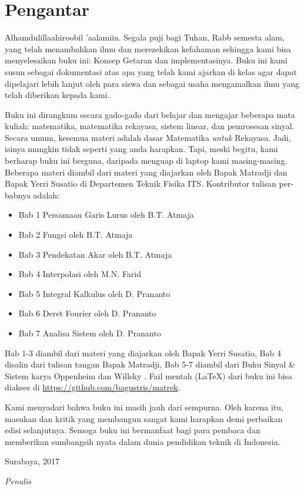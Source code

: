 \chapter*{Pengantar}

Alhamdulillaahiroobil 'aalamiin. Segala puji bagi Tuhan, Rabb semesta alam, yang telah menambahkan ilmu dan merezekikan kefahaman sehingga kami bisa menyelesaikan buku ini: Konsep Getaran dan implementasinya. Buku ini kami susun sebagai dokumentasi atas apa yang telah kami ajarkan di kelas agar dapat dipelajari lebih lanjut oleh para siswa dan sebagai usaha mengamalkan ilmu yang telah diberikan kepada kami.

Buku ini dirangkum secara gado-gado dari belajar dan mengajar beberapa mata kuliah: matematika, matematika rekayasa, sistem linear, dan pemrosesan sinyal. Secara umum, kesemua materi adalah dasar Matematika \textit{untuk} Rekayasa. Jadi, isinya mungkin tidak seperti yang anda harapkan. Tapi, meski begitu, kami berharap buku ini berguna, daripada menguap di laptop kami masing-masing. Beberapa materi diambil dari materi yang diajarkan oleh Bapak Matradji dan Bapak Yerri Susatio di Departemen Teknik Fisika ITS. Kontributor tulisan per-babnya adalah:  
\begin{itemize}
    \item Bab 1 Persamaan Garis Lurus oleh B.T. Atmaja 
    \item Bab 2 Fungsi oleh B.T. Atmaja 
    \item Bab 3 Pendekatan Akar oleh B.T. Atmaja 
    \item Bab 4 Interpolasi oleh M.N. Farid  
    \item Bab 5 Integral Kalkulus oleh D. Prananto 
    \item Bab 6 Deret Fourier oleh D. Prananto
    \item Bab 7 Analisa Sistem oleh D. Prananto  
\end{itemize}
Bab 1-3 diambil dari materi yang diajarkan oleh Bapak Yerri Susatio, Bab 4 disalin dari tulisan tangan Bapak Matradji, Bab 5-7 diambil dari Buku Sinyal \& Sistem karya Oppenheim dan Willsky \cite{oppenheim1997signals}. Fail mentah (\LaTeX) dari buku ini bisa diakses di \url{https://github.com/bagustris/matrek}.  

Kami menyadari bahwa buku ini masih jauh dari sempurna. Oleh karena itu, masukan dan kritik yang membangun sangat kami harapkan demi perbaikan edisi selanjutnya. Semoga buku ini bermanfaat bagi para pembaca dan memberikan sumbangsih nyata dalam dunia pendidikan teknik di Indonesia.

\vspace{1cm}
\noindent Surabaya, 2017   

\vspace{0.5cm}
\noindent \textit{Penulis}

